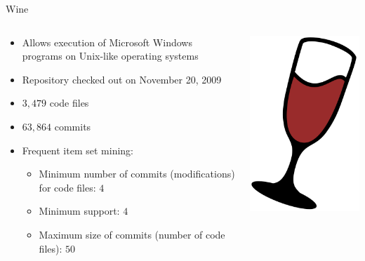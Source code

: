 \begin{frame}{Wine}
  \begin{columns}[c]
    \begin{column}{0.70\textwidth}
      \begin{itemize}
      \item Allows execution of Microsoft Windows programs on
        Unix-like operating systems
      \item Repository checked out on November 20, 2009
      \item $3,479$ code files
      \item $63,864$ commits
      \item Frequent item set mining:
        \begin{itemize}
        \item Minimum number of commits (modifications) for code
          files: $4$
        \item Minimum support: $4$
        \item Maximum size of commits (number of code files): $50$
        \end{itemize}
      \end{itemize}
    \end{column}
    \begin{column}{0.30\textwidth}
      \includegraphics[width=\textwidth]{figures/wine-logo}

\end{column}
\end{columns}
\end{frame}
